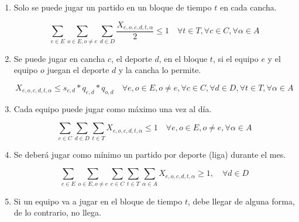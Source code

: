 \begin{enumerate}

    \item Solo se puede jugar un partido en un bloque de tiempo $t$ en cada cancha.
    
        \[\sum_{e\in E}\sum_{o\in E, o\neq e}\sum_{d\in D}{\frac{X_{e,o,c,d,t,\alpha}}{2}}\leq 1 \quad \forall t\in T,\forall c\in C, \forall \alpha\in A\]
    
   
    \item Se puede jugar en cancha $c$, el deporte $d$, en el bloque $t$, si el equipo $e$ y el equipo $o$ juegan el deporte $d$ y la cancha lo permite.
    
        \[X_{e,o,c,d,t,\alpha}\leq s_{c,d}*q_{e,d}*q_{o,d} \quad \forall e,o\in E, o\neq e, \forall c\in C,\forall d\in D,\forall t\in T, \forall \alpha\in A\]
    
    \item Cada equipo puede jugar como máximo una vez al día.
    
        \[\sum_{c\in C}\sum_{d\in D}\sum_{t\in T}{X_{e,o,c,d,t,\alpha}}\leq 1 \quad \forall e,o\in E,o\neq e,\forall \alpha\in A\]
    
    \item Se deberá jugar como mínimo un partido por deporte (liga) durante el mes.
    
        \[\sum_{e\in E}\sum_{o\in E, o\neq e}\sum_{c\in C}\sum_{t\in T}\sum_{\alpha\in A}X_{e,o,c,d,t,\alpha} \geq 1, \quad \forall d\in D \]
    
    
        
        
    
    
    \item Si un equipo va a jugar en el bloque de tiempo $t$, debe llegar de alguna forma, de lo contrario, no llega.
    

\end{enumerate}
